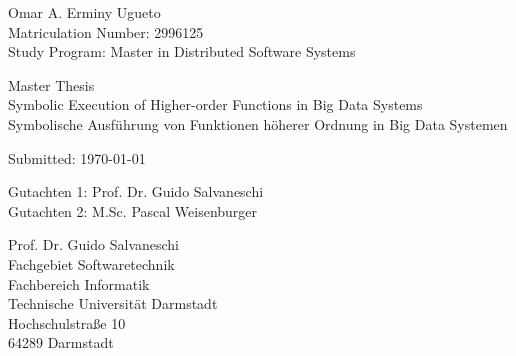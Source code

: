 \begin{tabular}{c}\end{tabular}
\vfill
Omar A. Erminy Ugueto\\
Matriculation Number: 2996125\\
Study Program: Master in Distributed Software Systems
 
Master Thesis\\
Symbolic Execution of Higher-order Functions in Big Data Systems \\
Symbolische Ausführung von Funktionen höherer Ordnung in Big Data Systemen

Submitted: \today

Gutachten 1: Prof. Dr. Guido Salvaneschi \\
Gutachten 2: M.Sc. Pascal Weisenburger 

Prof. Dr. Guido Salvaneschi\\
Fachgebiet Softwaretechnik \\
Fachbereich Informatik\\
Technische Universität Darmstadt\\
Hochschulstraße 10\\
64289 Darmstadt